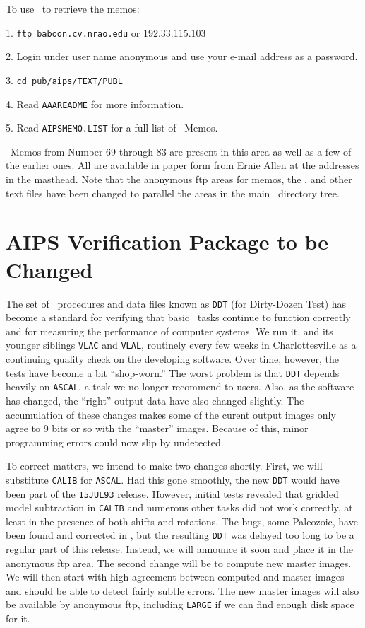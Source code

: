 To use \ftp\ to retrieve the memos:
\begin{description}
\item{ 1.} {\tt ftp baboon.cv.nrao.edu}  or  192.33.115.103
\item{ 2.} Login under user name anonymous and use your e-mail address
           as a password.
\item{ 3.} {\tt cd pub/aips/TEXT/PUBL}
\item{ 4.} Read {\tt AAAREADME} for more information.
\item{ 5.} Read {\tt AIPSMEMO.LIST} for a full list of \AIPS\ Memos.
\end{description}

\AIPS\ Memos from Number 69 through 83 are present in this area as
well as a few of the earlier ones.  All are available in paper form
from Ernie Allen at the addresses in the masthead.  Note that the
anonymous ftp areas for memos, the \Cookbook, and other text files
have been changed to parallel the areas in the main \AIPS\ directory
tree.

\clearpage

\section{AIPS Verification Package to be Changed}

The set of \AIPS\ procedures and data files known as {\tt DDT} (for
Dirty-Dozen Test) has become a standard for verifying that basic
\AIPS\ tasks continue to function correctly and for measuring the
performance of computer systems.  We run it, and its younger siblings
{\tt VLAC} and {\tt VLAL}, routinely every few weeks in
Charlottesville as a continuing quality check on the developing
software.  Over time, however, the tests have become a bit
``shop-worn.''  The worst problem is that {\tt DDT} depends heavily on
{\tt ASCAL}, a task we no longer recommend to users.  Also, as the
software has changed, the ``right'' output data have also changed
slightly.  The accumulation of these changes makes some of the curent
output images only agree to 9 bits or so with the ``master'' images.
Because of this, minor programming errors could now slip by
undetected.

To correct matters, we intend to make two changes shortly.  First, we
will substitute {\tt CALIB} for \hbox{{\tt ASCAL}}.  Had this gone
smoothly, the new {\tt DDT} would have been part of the {\tt 15JUL93}
release.  However, initial tests revealed that gridded model
subtraction in {\tt CALIB} and numerous other tasks did not work
correctly, at least in the presence of both shifts and rotations.  The
bugs, some Paleozoic, have been found and corrected in \RELEASENAME,
but the resulting {\tt DDT} was delayed too long to be a regular part
of this release.  Instead, we will announce it soon and place it in
the anonymous ftp area.  The second change will be to compute new
master images.  We will then start with high agreement between
computed and master images and should be able to detect fairly subtle
errors.  The new master images will also be available by anonymous
ftp, including {\tt LARGE} if we can find enough disk space for it.

